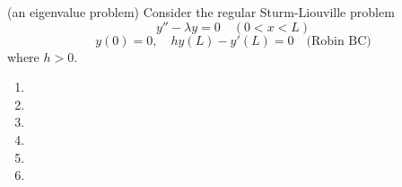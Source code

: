 (an eigenvalue problem) Consider the regular Sturm-Liouville problem
$$y''-\lambda y =0 \quad (0 < x < L)$$
$$y(0)=0, \quad hy(L)-y'(L)=0 \quad \text{(Robin BC)}$$
where $h>0$.
\begin{enumerate}
\item \newpage
\item \newpage
\item \newpage
\item \newpage
\item \newpage
\item 
\end{enumerate}
